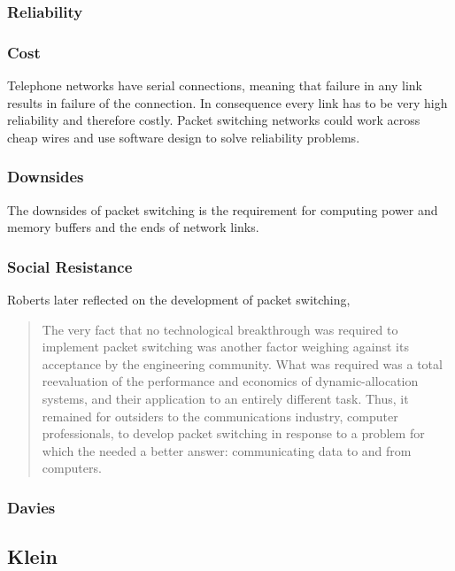 \subsubsection{Reliability}

\subsubsection{Cost}

Telephone networks have serial connections, meaning that failure in any link results in failure of
the connection. In consequence every link has to be very high reliability and therefore costly.
Packet switching networks could work across cheap wires and use software design to solve reliability
problems.

\subsubsection{Downsides}

The downsides of packet switching is the requirement for computing power and memory buffers and the
ends of network links.

\subsubsection{Social Resistance}

Roberts\cite{roberts1978} later reflected on the development of packet switching,

\begin{quote}
The very fact that no technological breakthrough was required to implement packet switching was
another factor weighing against its acceptance by the engineering community. What was required was a
total reevaluation of the performance and economics of dynamic-allocation systems, and their
application to an entirely different task. Thus, it remained for outsiders to the communications
industry, computer professionals, to develop packet switching in response to a problem for which the
    needed a better answer: communicating data to and from computers.
\end{quote}

\subsubsection{Davies}




\subsection{Klein}

